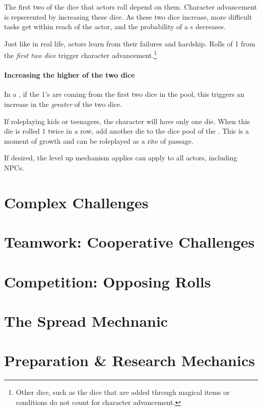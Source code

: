 \label{subsec:character_advancement}

The first two of the dice that actors roll depend on them.
Character advancement is repserented by increasing these dice.
As these two dice increase, more difficult tasks get within reach of the actor,
and the probability of a s decreases.

Just like in real life, actors learn from their failures and hardship.
Rolls of 1 from the \emph{first two dice} trigger character advancement.\footnote{Other dice, such as the dice that are added through magical items or conditions do not count for character advancement.}

\paragraph*{Increasing the higher of the two dice}
In a , if the $1$'s are coming from the first two dice in the pool, this
triggers an increase in the \emph{greater} of the two dice.

If roleplaying kids or teenagers, the character will have only one die. When this die is rolled
$1$ twice in a row, add another die to the dice pool of the .
This is a moment of growth and can be roleplayed as a rite of passage.

If desired, the level up mechanism applies can apply to all actors, including NPCs.

\section{Complex Challenges}

\section{Teamwork: Cooperative Challenges}


\section{Competition: Opposing Rolls}

\section{The Spread Mechnanic}

\section{Preparation \& Research Mechanics}

